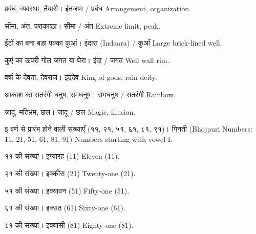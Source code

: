 %
{प्रबंध, व्यवस्था, तैयारी।}%
{इंतजाम / प्रबंध}%
{Arrangement, organization.}

%
{सीमा, अंत, पराकाष्ठा।}%
{सीमा / अंत}%
{Extreme limit, peak.}

%
{ईंटों का बना बड़ा पक्का कुआं।}%
{इंदारा (Indaara) / कुआँ}%
{Large brick-lined well.}

%
{कुएं का ऊपरी गोल जगत या घेरा।}%
{इंदा / जगत}%
{Well wall rim.}

%
{वर्षा के देवता, देवराज।}%
{इंद्रदेव}%
{King of gods, rain deity.}

%
{आकाश का सतरंगी धनुष, रामधनुष।}%
{रामधनुष / सतरंगी}%
{Rainbow.}

%
{जादू, मतिभ्रम, छल।}%
{जादू / छल}%
{Magic, illusion.}

%
{इ वर्ण से प्रारंभ होने वाली संख्याएँ (११, २१, ५१, ६१, ८१, ९१)।}%
{गिनती (Bhojpuri Numbers: 11, 21, 51, 61, 81, 91)}%
{Numbers starting with vowel I.}

%
{११ की संख्या।}%
{इग्यारह (11)}%
{Eleven (11).}

%
{२१ की संख्या।}%
{इक्कीस (21)}%
{Twenty-one (21).}

%
{५१ की संख्या।}%
{इक्यावन (51)}%
{Fifty-one (51).}

%
{६१ की संख्या।}%
{इक्सठ (61)}%
{Sixty-one (61).}

%
{८१ की संख्या।}%
{इक्यासी (81)}%
{Eighty-one (81).}


